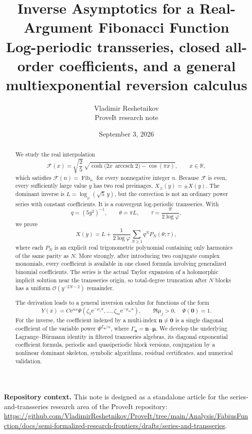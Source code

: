 \documentclass[11pt,oneside]{article}
\title{\bfseries\LARGE Inverse Asymptotics for a Real-Argument Fibonacci Function\\[0.4em]
\Large Log-periodic transseries, closed all-order coefficients, and a general multiexponential reversion calculus}
\author{Vladimir Reshetnikov\\\small ProveIt research note}
\date{September 3, 2026}
\numberwithin{equation}{section}
\newcommand{\Fib}{\operatorname{Fib}}
\newcommand{\e}{\mathrm{e}}
\newcommand{\RR}{\mathbb{R}}
\newcommand{\cF}{\mathcal{F}}
\newcommand{\vct}[1]{\boldsymbol{#1}}
\newcommand{\bigO}{\mathcal{O}}
\begin{document}
\maketitle

\begin{abstract}
We study the real interpolation
\[
  \cF(x)=\sqrt{\frac25}\,
  \sqrt{\cosh\!\bigl(2x\,\operatorname{arccsch}2\bigr)-\cos(\pi x)},
  \qquad x\in\RR,
\]
which satisfies \(\cF(n)=\Fib_n\) for every nonnegative integer \(n\).
Because \(\cF\) is even, every sufficiently large value \(y\) has two real preimages,
\(X_\pm(y)=\pm X(y)\).  The dominant inverse is
\(L=\log_\varphi(\sqrt5\,y)\), but the correction is not an ordinary power
series with constant coefficients.  It is a convergent log-periodic transseries.
With
\[
 q=(5y^2)^{-1},\qquad \theta=\pi L,\qquad
 \tau=\frac{\pi}{2\log\varphi},
\]
we prove
\[
 X(y)=L+\frac1{2\log\varphi}\sum_{N\ge1}q^N P_N(\theta;\tau),
\]
where each \(P_N\) is an explicit real trigonometric polynomial containing only
harmonics of the same parity as \(N\).  More strongly, after introducing two
conjugate complex monomials, every coefficient is available in one closed
formula involving generalized binomial coefficients.  The series is the actual
Taylor expansion of a holomorphic implicit solution near the transseries origin,
so total-degree truncation after \(N\) blocks has a uniform
\(\bigO(y^{-2N-2})\) remainder.

The derivation leads to a general inversion calculus for functions of the form
\[
 Y(x)=C\e^{\alpha x}\Psi\!\left(\zeta_1\e^{-\mu_1x},\ldots,
 \zeta_m\e^{-\mu_mx}\right),
 \qquad \Re\mu_j>0,\quad \Psi(\vct0)=1.
\]
For the inverse, the coefficient indexed by a multi-index \(\vct n\ne\vct0\)
is a single diagonal coefficient of the variable power
\(\Psi^{\Gamma_{\vct n}/\alpha}\), where
\(\Gamma_{\vct n}=\vct n\cdot\vct\mu\).  We develop the underlying
Lagrange--B\"urmann identity in filtered transseries algebras, its diagonal
exponential coefficient formula, periodic and quasiperiodic block versions,
conjugation by a nonlinear dominant skeleton, symbolic algorithms, residual
certificates, and numerical validation.
\end{abstract}

\begin{center}
\small
\textbf{Repository context.}
This note is designed as a standalone article for the series-and-transseries
research area of the ProveIt repository:
\url{https://github.com/VladimirReshetnikov/ProveIt/tree/main/Analysis/FabiusFunction/docs/semi-formalized-research-frontiers/drafts/series-and-transseries}.
\end{center}
\end{document}
